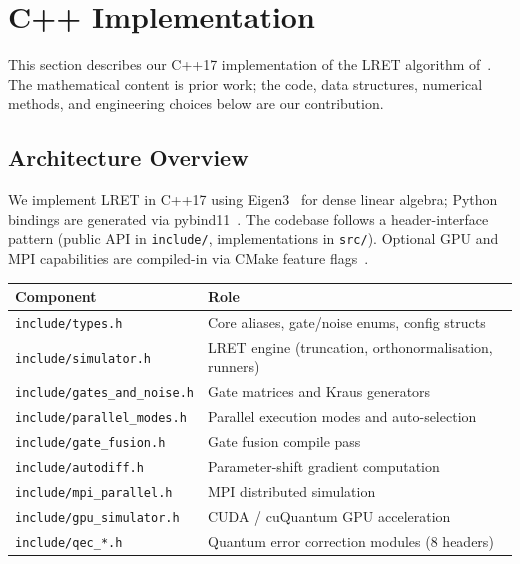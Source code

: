 \documentclass[11pt,a4paper]{article}
\begin{document}
\section{C++ Implementation}
\label{sec:cpp}

This section describes our C++17 implementation of the LRET algorithm
of~\cite{chen2021lret}. The mathematical content is prior work; the code, data
structures, numerical methods, and engineering choices below are our contribution.

\subsection{Architecture Overview}

We implement LRET in C++17 using Eigen3~\cite{eigen2010} for dense linear algebra;
Python bindings are generated via pybind11~\cite{pybind11}. The codebase follows a
header-interface pattern (public API in \texttt{include/}, implementations in
\texttt{src/}). Optional GPU and MPI capabilities are compiled-in via CMake feature
flags~\cite{cmake}.

\begin{center}
\renewcommand{\arraystretch}{1.2}
\begin{tabular}{@{}lp{9cm}@{}}
\toprule
\textbf{Component} & \textbf{Role} \\
\midrule
\texttt{include/types.h}             & Core aliases, gate/noise enums, config structs \\
\texttt{include/simulator.h}         & LRET engine (truncation, orthonormalisation, runners) \\
\texttt{include/gates\_and\_noise.h} & Gate matrices and Kraus generators \\
\texttt{include/parallel\_modes.h}   & Parallel execution modes and auto-selection \\
\texttt{include/gate\_fusion.h}      & Gate fusion compile pass \\
\texttt{include/autodiff.h}          & Parameter-shift gradient computation \\
\texttt{include/mpi\_parallel.h}     & MPI distributed simulation \\
\texttt{include/gpu\_simulator.h}    & CUDA / cuQuantum GPU acceleration \\
\texttt{include/qec\_*.h}            & Quantum error correction modules (8 headers) \\
\bottomrule
\end{tabular}
\end{center}
\end{document}

